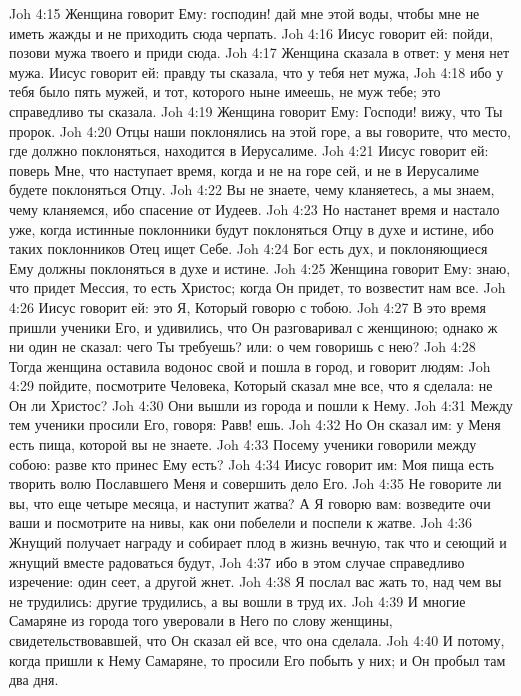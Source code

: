 \vs Joh 4:15 Женщина говорит Ему: господин! дай мне этой воды, чтобы мне не иметь жажды и не приходить сюда черпать.
\vs Joh 4:16 Иисус говорит ей: пойди, позови мужа твоего и приди сюда.
\vs Joh 4:17 Женщина сказала в ответ: у меня нет мужа. Иисус говорит ей: правду ты сказала, что у тебя нет мужа,
\vs Joh 4:18 ибо у тебя было пять мужей, и тот, которого ныне имеешь, не муж тебе; это справедливо ты сказала.
\vs Joh 4:19 Женщина говорит Ему: Господи! вижу, что Ты пророк.
\vs Joh 4:20 Отцы наши поклонялись на этой горе, а вы говорите, что место, где должно поклоняться, находится в Иерусалиме.
\vs Joh 4:21 Иисус говорит ей: поверь Мне, что наступает время, когда и не на горе сей, и не в Иерусалиме будете поклоняться Отцу.
\vs Joh 4:22 Вы не знаете, чему кланяетесь, а мы знаем, чему кланяемся, ибо спасение от Иудеев.
\vs Joh 4:23 Но настанет время и настало уже, когда истинные поклонники будут поклоняться Отцу в духе и истине, ибо таких поклонников Отец ищет Себе.
\vs Joh 4:24 Бог есть дух, и поклоняющиеся Ему должны поклоняться в духе и истине.
\vs Joh 4:25 Женщина говорит Ему: знаю, что придет Мессия, то есть Христос; когда Он придет, то возвестит нам все.
\vs Joh 4:26 Иисус говорит ей: это Я, Который говорю с тобою.
\vs Joh 4:27 В это время пришли ученики Его, и удивились, что Он разговаривал с женщиною; однако ж ни один не сказал: чего Ты требуешь? или: о чем говоришь с нею?
\vs Joh 4:28 Тогда женщина оставила водонос свой и пошла в город, и говорит людям:
\vs Joh 4:29 пойдите, посмотрите Человека, Который сказал мне все, что я сделала: не Он ли Христос?
\vs Joh 4:30 Они вышли из города и пошли к Нему.
\vs Joh 4:31 Между тем ученики просили Его, говоря: Равв! ешь.
\vs Joh 4:32 Но Он сказал им: у Меня есть пища, которой вы не знаете.
\vs Joh 4:33 Посему ученики говорили между собою: разве кто принес Ему есть?
\vs Joh 4:34 Иисус говорит им: Моя пища есть творить волю Пославшего Меня и совершить дело Его.
\vs Joh 4:35 Не говорите ли вы, что еще четыре месяца, и наступит жатва? А Я говорю вам: возведите очи ваши и посмотрите на нивы, как они побелели и поспели к жатве.
\vs Joh 4:36 Жнущий получает награду и собирает плод в жизнь вечную, так что и сеющий и жнущий вместе радоваться будут,
\vs Joh 4:37 ибо в этом случае справедливо изречение: один сеет, а другой жнет.
\vs Joh 4:38 Я послал вас жать то, над чем вы не трудились: другие трудились, а вы вошли в труд их.
\vs Joh 4:39 И многие Самаряне из города того уверовали в Него по слову женщины, свидетельствовавшей, что Он сказал ей все, что она сделала.
\vs Joh 4:40 И потому, когда пришли к Нему Самаряне, то просили Его побыть у них; и Он пробыл там два дня.
